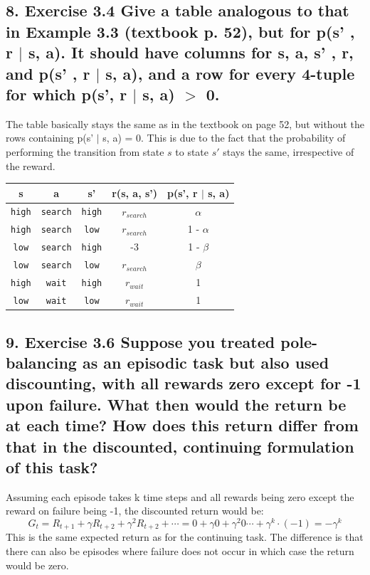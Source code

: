 \subsection*{8. Exercise 3.4 Give a table analogous to that in Example 3.3 (textbook p. 52), but for p(s' , r $\mid$ s, a). It should have columns for s, a, s' , r, and p(s' , r $\mid$ s, a), and a row for every 4-tuple for which p(s', r $\mid$  s, a) $>$ 0.}
The table basically stays the same as in the textbook on page 52, but without the rows containing p(s' $\mid$ s, a) = 0. This is due to the fact that the probability of performing the transition from state $s$ to state $s'$ stays the same, irrespective of the reward.
\begin{center}
\begin{table}[ht]
\centering
\begin{tabular}{|c|c|c|c|c|}
\hline 
s & a & s' & r(s, a, s') & p(s', r $\mid$ s, a) \\ 
\hline 
\hline
\texttt{high} & \texttt{search} & \texttt{high} & \texttt{$r_{search}$} & $\alpha$ \\ 
\hline 
\texttt{high} & \texttt{search} & \texttt{low} & \texttt{$r_{search}$} & 1 - $\alpha$ \\ 
\hline 
\texttt{low} & \texttt{search} & \texttt{high} & -3 & 1 - $\beta$ \\ 
\hline 
\texttt{low} & \texttt{search} & \texttt{low} & \texttt{$r_{search}$} & $\beta$ \\ 
\hline 
\texttt{high} & \texttt{wait} & \texttt{high} & \texttt{$r_{wait}$} & 1 \\ 
\hline 
\texttt{low} & \texttt{wait} & \texttt{low} & \texttt{$r_{wait}$} & 1 \\ 
\hline 
\end{tabular}
\end{table}
\end{center}

\subsection*{9. Exercise 3.6 Suppose you treated pole-balancing as an episodic task but also used discounting, with all rewards zero except for -1 upon failure. What then would the return be at each time? How does this return differ from that in the discounted, continuing formulation of this task?}
Assuming each episode takes k time steps and all rewards being zero except the reward on failure being -1, the discounted return would be:
$$
G_t = R_{t+1} + \gamma R_{t+2} + \gamma^2R_{t+2} + \cdots = 0 + \gamma 0 + \gamma^2 0 \cdots + \gamma^k \cdot (-1) = -\gamma^k
$$
This is the same expected return as for the continuing task. The difference is that there can also be episodes where failure does not occur in which case the return would be zero.

